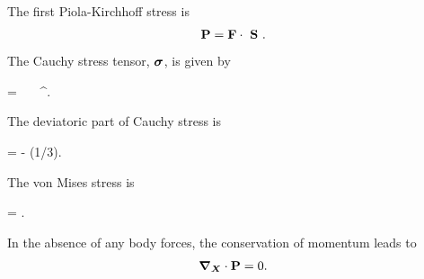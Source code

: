 The first Piola-Kirchhoff stress is
\begin{gather}
\PK = \F \cdot  \PKS  \label{eq:P_tensor}.
\end{gather}
The Cauchy stress tensor, $\bm{\sigma}$, is given by 
\begin{nonumbereq}\CS =  \F \cdot  \PKS  \cdot  \F^\T.
\end{nonumbereq} The deviatoric part of Cauchy stress is \begin{nonumbereq}\DCS = \CS - (1/3)\tr{\CS}\I.
\end{nonumbereq}
The von Mises stress is 
\begin{nonumbereq}
\sigmaeff = . 
\end{nonumbereq}

In the absence of any body forces, the conservation of momentum leads to 
\begin{gather}
\bm{\nabla}_{\bm{X}} \cdot \mathbf{P} = 0.
\end{gather}

